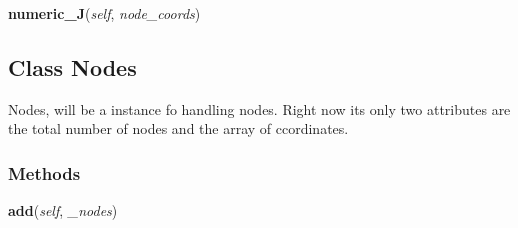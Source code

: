     \vspace{0.5ex}

\hspace{.8\funcindent}\begin{boxedminipage}{\funcwidth}

    \raggedright \textbf{numeric\_J}(\textit{self}, \textit{node\_coords})

\setlength{\parskip}{2ex}
\setlength{\parskip}{1ex}
    \end{boxedminipage}



\subsection{Class Nodes}

    \label{Classes:Nodes}
Nodes, will be a instance fo handling nodes. Right now its only two 
attributes are the total number of nodes and the array of ccordinates.



  \subsubsection{Methods}

    \label{Classes:Nodes:add}

    \vspace{0.5ex}

\hspace{.8\funcindent}\begin{boxedminipage}{\funcwidth}

    \raggedright \textbf{add}(\textit{self}, \textit{\_nodes})

\setlength{\parskip}{2ex}
\setlength{\parskip}{1ex}
    \end{boxedminipage}

